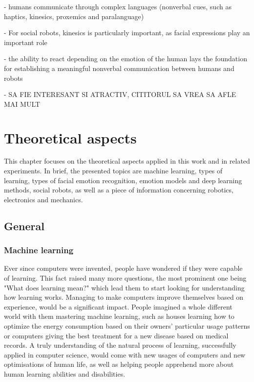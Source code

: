 \documentclass[runningheads,a4paper,12pt]{report}
\begin{document}
- humans communicate through complex languages (nonverbal cues, such as haptics, kinesics, proxemics and paralanguage)

- For social robots, kinesics is particularly important, as facial expressions play an important role

- the ability to react depending on the emotion of the human lays the foundation for establishing a meaningful nonverbal communication between humans and robots 

- SA FIE INTERESANT SI ATRACTIV, CITITORUL SA VREA SA AFLE MAI MULT

\chapter{Theoretical aspects}
\label{chapter:theoretical}

This chapter focuses on the theoretical aspects applied in this work and in related experiments. In brief, the presented topics are machine learning, types of learning, types of facial emotion recognition, emotion models and deep learning methods, social robots, as well as a piece of information concerning robotics, electronics and mechanics. 

\section{General}
\label{section:gen}

\subsection{Machine learning}
\label{section:ml}
Ever since computers were invented, people have wondered if they were capable of learning. This fact raised many more questions, the most prominent one being "What does learning mean?" which lead them to start looking for understanding how learning works. Managing to make computers improve themselves based on experience, would be a significant impact. People imagined a whole different world with them mastering machine learning, such as houses learning how to optimize the energy consumption based on their owners' particular usage patterns or computers giving the best treatment for a new disease based on medical records. A truly understanding of the natural process of learning, successfully applied in computer science, would come with new usages of computers and new optimisations of human life, as well as helping people apprehend more about human learning abilities and disabilities. 
\end{document}
